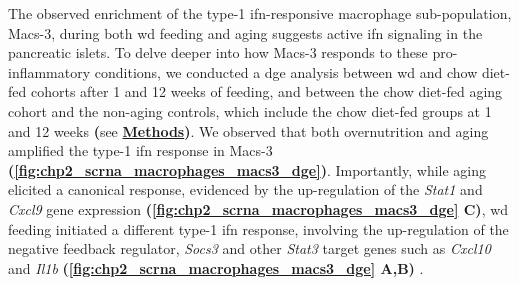 \par The observed enrichment of the type-1 \gls{ifn}-responsive macrophage sub-population, Macs-3, during both \gls{wd} feeding and aging suggests active \gls{ifn} signaling in the pancreatic islets. To delve deeper into how Macs-3 responds to these pro-inflammatory conditions, we conducted a \gls{dge} analysis between \gls{wd} and chow diet-fed cohorts after 1 and 12 weeks of feeding, and between the chow diet-fed aging cohort and the non-aging controls, which include the chow diet-fed groups at 1 and 12 weeks \textbf{(}see \hyperref[subsubsec:met_chp2_dge]{\textbf{Methods}}\textbf{)}. We observed that both overnutrition and aging amplified the type-1 \gls{ifn} response in Macs-3 \textbf{(\autoref{fig:chp2_scrna_macrophages_macs3_dge})}. Importantly, while aging elicited a canonical response, evidenced by the up-regulation of the \textit{Stat1} and \textit{Cxcl9} gene expression \textbf{(\autoref{fig:chp2_scrna_macrophages_macs3_dge} C)}, \gls{wd} feeding initiated a different type-1 \gls{ifn} response, involving the up-regulation of the negative feedback regulator, \textit{Socs3} and other \textit{Stat3} target genes such as \textit{Cxcl10} and \textit{Il1b} \textbf{(\autoref{fig:chp2_scrna_macrophages_macs3_dge} A,B)} \textbf{\cite{tsai_fine-tuning_2019}}.\\

